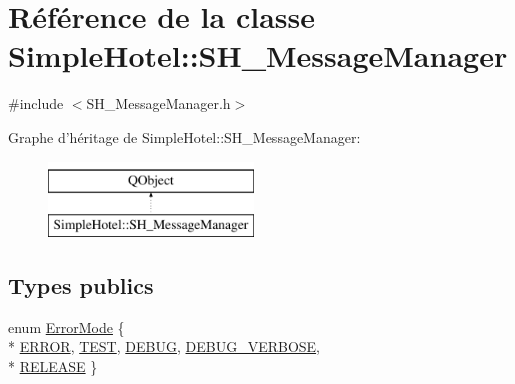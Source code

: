 \hypertarget{classSimpleHotel_1_1SH__MessageManager}{\section{Référence de la classe Simple\-Hotel\-:\-:S\-H\-\_\-\-Message\-Manager}
\label{classSimpleHotel_1_1SH__MessageManager}
}


{\ttfamily \#include $<$S\-H\-\_\-\-Message\-Manager.\-h$>$}

Graphe d'héritage de Simple\-Hotel\-:\-:S\-H\-\_\-\-Message\-Manager\-:\begin{figure}[H]
\begin{center}
\leavevmode
\includegraphics[height=2.000000cm]{classSimpleHotel_1_1SH__MessageManager}
\end{center}
\end{figure}
\subsection*{Types publics}
\begin{DoxyCompactItemize}
\item 
enum \hyperlink{classSimpleHotel_1_1SH__MessageManager_aa33976e3103be652643d64f534b92274}{Error\-Mode} \{ \\*
\hyperlink{classSimpleHotel_1_1SH__MessageManager_aa33976e3103be652643d64f534b92274a4f0c3ae1d6a4995756cf128fef475278}{E\-R\-R\-O\-R}, 
\hyperlink{classSimpleHotel_1_1SH__MessageManager_aa33976e3103be652643d64f534b92274ae2276cb3bbc05f36a976a51609b98c65}{T\-E\-S\-T}, 
\hyperlink{classSimpleHotel_1_1SH__MessageManager_aa33976e3103be652643d64f534b92274a7dbbe751758fdbdec31b4c4be289ad9c}{D\-E\-B\-U\-G}, 
\hyperlink{classSimpleHotel_1_1SH__MessageManager_aa33976e3103be652643d64f534b92274afe98674c335c7024d633ba4488638e4c}{D\-E\-B\-U\-G\-\_\-\-V\-E\-R\-B\-O\-S\-E}, 
\\*
\hyperlink{classSimpleHotel_1_1SH__MessageManager_aa33976e3103be652643d64f534b92274a44e10093bc9731fae63223ca25d3d01c}{R\-E\-L\-E\-A\-S\-E}
 \}
\end{DoxyCompactItemize}
